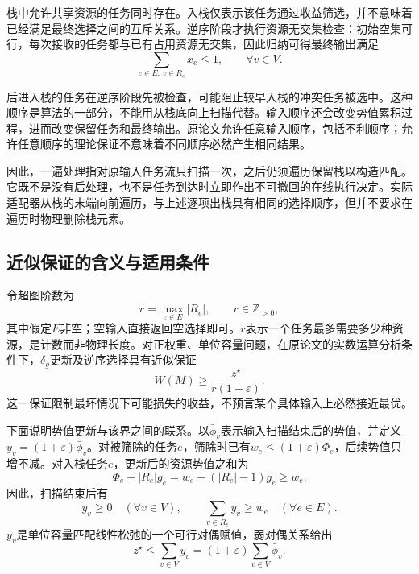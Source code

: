 栈中允许共享资源的任务同时存在。入栈仅表示该任务通过收益筛选，并不意味着已经满足最终选择之间的互斥关系。逆序阶段才执行资源无交集检查：初始空集可行，每次接收的任务都与已有占用资源无交集，因此归纳可得最终输出满足
\begin{equation}
 \sum_{e\in E:\,v\in R_e}x_e\leq1,
 \qquad\forall v\in V.
\label{s0302:output_feasibility}
\end{equation}

后进入栈的任务在逆序阶段先被检查，可能阻止较早入栈的冲突任务被选中。这种顺序是算法的一部分，不能用从栈底向上扫描代替。输入顺序还会改变势值累积过程，进而改变保留任务和最终输出。原论文允许任意输入顺序，包括不利顺序；允许任意顺序的理论保证不意味着不同顺序必然产生相同结果。

因此，一遍处理指对原输入任务流只扫描一次，之后仍须遍历保留栈以构造匹配。它既不是没有后处理，也不是任务到达时立即作出不可撤回的在线执行决定。实际适配器从栈的末端向前遍历，与上述逐项出栈具有相同的选择顺序，但并不要求在遍历时物理删除栈元素。

\subsection{近似保证的含义与适用条件}

令超图阶数为
\begin{equation}
 r=\max_{e\in E}|R_e|,
 \qquad r\in\mathbb{Z}_{>0},
\label{s0302:rank}
\end{equation}
其中假定$E$非空；空输入直接返回空选择即可。$r$表示一个任务最多需要多少种资源，是计数而非物理长度。对正权重、单位容量问题，在原论文的实数运算分析条件下，$\delta_g$更新及逆序选择具有近似保证\cite{ReinstadtlerFPU2025}
\begin{equation}
 W(M)\geq\frac{z^\star}{r(1+\varepsilon)}.
\label{s0302:approximation}
\end{equation}
这一保证限制最坏情况下可能损失的收益，不预言某个具体输入上必然接近最优。

下面说明势值更新与该界之间的联系。以$\bar\phi_v$表示输入扫描结束后的势值，并定义$y_v=(1+\varepsilon)\bar\phi_v$。对被筛除的任务$e$，筛除时已有$w_e\leq(1+\varepsilon)\Phi_e$，后续势值只增不减。对入栈任务$e$，更新后的资源势值之和为
\begin{equation}
 \Phi_e+|R_e|g_e
 =w_e+(|R_e|-1)g_e\geq w_e.
\label{s0302:accepted_dual_coverage}
\end{equation}
因此，扫描结束后有
\begin{equation}
 y_v\geq0\quad(\forall v\in V),
 \qquad
 \sum_{v\in R_e}y_v\geq w_e\quad(\forall e\in E).
\label{s0302:dual_feasibility}
\end{equation}
$y_v$是单位容量匹配线性松弛的一个可行对偶赋值，弱对偶关系给出
\begin{equation}
 z^\star\leq\sum_{v\in V}y_v
 =(1+\varepsilon)\sum_{v\in V}\bar\phi_v.
\label{s0302:dual_bound}
\end{equation}

